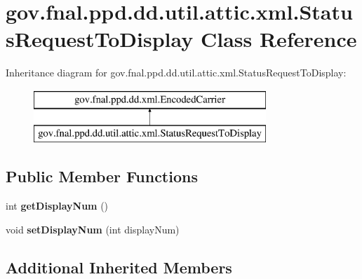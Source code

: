 \hypertarget{classgov_1_1fnal_1_1ppd_1_1dd_1_1util_1_1attic_1_1xml_1_1StatusRequestToDisplay}{\section{gov.\-fnal.\-ppd.\-dd.\-util.\-attic.\-xml.\-Status\-Request\-To\-Display Class Reference}
\label{classgov_1_1fnal_1_1ppd_1_1dd_1_1util_1_1attic_1_1xml_1_1StatusRequestToDisplay}
}
Inheritance diagram for gov.\-fnal.\-ppd.\-dd.\-util.\-attic.\-xml.\-Status\-Request\-To\-Display\-:\begin{figure}[H]
\begin{center}
\leavevmode
\includegraphics[height=2.000000cm]{classgov_1_1fnal_1_1ppd_1_1dd_1_1util_1_1attic_1_1xml_1_1StatusRequestToDisplay}
\end{center}
\end{figure}
\subsection*{Public Member Functions}
\begin{DoxyCompactItemize}
\item 
\hypertarget{classgov_1_1fnal_1_1ppd_1_1dd_1_1util_1_1attic_1_1xml_1_1StatusRequestToDisplay_a67c32326d71636099e5732d93acfc21d}{int {\bfseries get\-Display\-Num} ()}\label{classgov_1_1fnal_1_1ppd_1_1dd_1_1util_1_1attic_1_1xml_1_1StatusRequestToDisplay_a67c32326d71636099e5732d93acfc21d}

\item 
\hypertarget{classgov_1_1fnal_1_1ppd_1_1dd_1_1util_1_1attic_1_1xml_1_1StatusRequestToDisplay_ac1923f9d64457fa294edb500917c1514}{void {\bfseries set\-Display\-Num} (int display\-Num)}\label{classgov_1_1fnal_1_1ppd_1_1dd_1_1util_1_1attic_1_1xml_1_1StatusRequestToDisplay_ac1923f9d64457fa294edb500917c1514}

\end{DoxyCompactItemize}
\subsection*{Additional Inherited Members}


